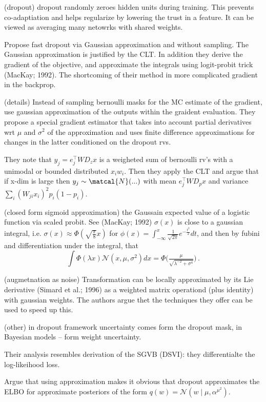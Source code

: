 (dropout)
dropout randomly zeroes hidden units during training. This prevents co-adaptiation and 
helps regularize by lowering the trust in a feature. It can be viewed as averaging many
netowrks with shared weights.

Propose fast dropout via Gaussian approximation and without sampling. The Gaussian
approximation is justified by the CLT. In addition they derive the gradient of the objective,
and approximate the integrals using logit-probit trick (MacKay; 1992). The shortcoming
of their method in more complicated gradient in the backprop.

(details)
Instead of sampling bernoulli masks for the MC estimate of the gradient, use gaussian
approximation of the outputs within the graident evaluation. They propose a special
gradient estimator that takes into account partial derivatives wrt $\mu$ and $\sigma^2$
of the approximation and uses finite difference approximations for changes in the latter
conditioned on the dropout rvs.

They note that $y_j = e_j^\top W D_z x$ is a weigheted sum of bernoulli rv's with a
unimodal or bounded distributed $x_i w_i$. Then they apply the CLT and argue that if
x-dim is large then $y_j \sim \matcal{N}(...)$  with mean  $e_j^\top W D_p x$ and
variance $\sum_i (W_{ji} x_i)^2 p_i(1 - p_i)$. 

(closed form sigmoid approximation)
the Gaussain expected value of a logistic function via scaled probit. See (MacKay; 1992)
$\sigma(x)$ is close to a gaussian integral, i.e. $
  \sigma(x) \approx \Phi(\sqrt{\tfrac\pi8} x)
$ for $
  \phi(x) = \int_{-\infty}^x \tfrac1{\sqrt{2\pi}} e^{-\tfrac{t^2}2} dt
$, and then by fubini and differentiation under the integral, that
$$
\int \Phi(\lambda x) \mathcal{N}(x, \mu, \sigma^2) dx
    = \Phi\bigl(
        \tfrac\mu{\sqrt{\lambda^{-2} + \sigma^4}}
    \bigr)
    \,. $$

(augmetnation as noise) Transformation can be locally approximated by its Lie derivative
(Simard et al.; 1996) as a weighted matrix operationd (plus identity) with gaussian weights.
The authors argue thet the techniques they offer can be used to speed up this.

(other)
in dropout framework uncertainty comes form the dropout mask, in Bayesian models -- form
weight uncertainty. 

Their analysis resembles derivation of the SGVB (DSVI): they differentialte the log-likeihood
loss.

Argue that using approximation makes it obvious that dropout approximates the ELBO for
approximate posteriors of the form $
  q(w) = \mathcal{N}(w\mid \mu, \alpha^\mu^2)
$.
